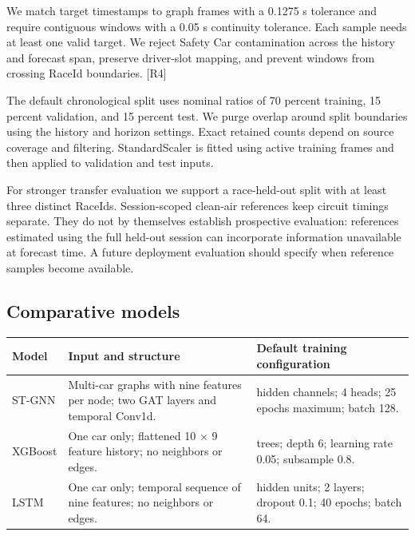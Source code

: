 \documentclass[11pt,a4paper,oneside]{report}
\begin{document}
We match target timestamps to graph frames with a 0.1275 s tolerance and require contiguous windows with a 0.05 s continuity tolerance. Each sample needs at least one valid target. We reject Safety Car contamination across the history and forecast span, preserve driver-slot mapping, and prevent windows from crossing RaceId boundaries. [R4]

The default chronological split uses nominal ratios of 70 percent training, 15 percent validation, and 15 percent test. We purge overlap around split boundaries using the history and horizon settings. Exact retained counts depend on source coverage and filtering. StandardScaler is fitted using active training frames and then applied to validation and test inputs.

For stronger transfer evaluation we support a race-held-out split with at least three distinct RaceIds. Session-scoped clean-air references keep circuit timings separate. They do not by themselves establish prospective evaluation: references estimated using the full held-out session can incorporate information unavailable at forecast time. A future deployment evaluation should specify when reference samples become available.

\subsection*{Comparative models}


\begin{center}\small\begin{tabularx}{\textwidth}{@{}>{\raggedright\arraybackslash}X>{\raggedright\arraybackslash}X>{\raggedright\arraybackslash}X@{}}

\toprule

Model & Input and structure & Default training configuration \\

\midrule

ST-GNN & Multi-car graphs with nine features per node; two GAT layers and temporal Conv1d. & 64 hidden channels; 4 heads; 25 epochs maximum; batch 128. \\

XGBoost & One car only; flattened 10 × 9 feature history; no neighbors or edges. & 100 trees; depth 6; learning rate 0.05; subsample 0.8. \\

LSTM & One car only; temporal sequence of nine features; no neighbors or edges. & 64 hidden units; 2 layers; dropout 0.1; 40 epochs; batch 64. \\

\bottomrule\end{tabularx}\end{center}
\end{document}

